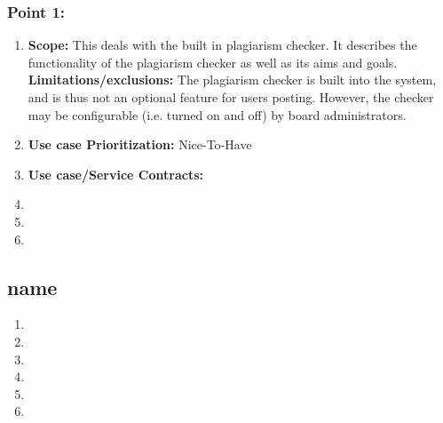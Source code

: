 \documentclass[11pt]{article}
\begin{document}
\subsubsection{Point 1: }
\begin{enumerate}
\item \textbf{Scope: }
This deals with the built in plagiarism checker. It describes the functionality of the plagiarism checker as well as its aims and goals.
\newline
\textbf{Limitations/exclusions:} 
The plagiarism checker is built into the system, and is thus not an optional feature for users posting. However, the checker may be configurable (i.e. turned on and off) by board administrators.
\item \textbf{Use case Prioritization: } Nice-To-Have
\item \textbf{Use case/Service Contracts: }
\graphicspath{ {C:/Users/Tienie/Desktop/GitLat/Activity.jpg} }
\item 
\item 
\item 
\end{enumerate}

\newpage

\subsection{name}
\begin{enumerate}
\item 
\item 
\item 
\item 
\item 
\item 
\end{enumerate}

\newpage
\end{document}
